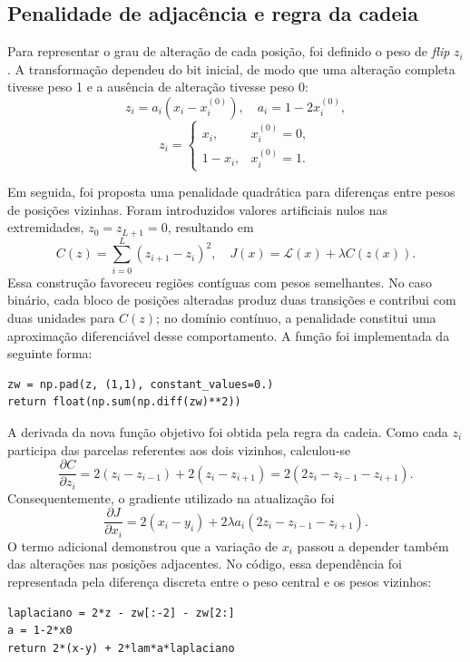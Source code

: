 \documentclass[10pt,a4paper,twocolumn]{article}
\begin{document}
\subsection{Penalidade de adjacência e regra da cadeia}
Para representar o grau de alteração de cada posição, foi definido o peso de \textit{flip} $z_i$. A transformação dependeu do bit inicial, de modo que uma alteração completa tivesse peso 1 e a ausência de alteração tivesse peso 0:
\begin{equation}
 z_i=a_i(x_i-x_i^{(0)}), \quad a_i=1-2x_i^{(0)},
\end{equation}
\vspace{-.8em}
\begin{equation}
z_i=\begin{cases}x_i,&x_i^{(0)}=0,\\1-x_i,&x_i^{(0)}=1.\end{cases}
\end{equation}

Em seguida, foi proposta uma penalidade quadrática para diferenças entre pesos de posições vizinhas. Foram introduzidos valores artificiais nulos nas extremidades, $z_0=z_{L+1}=0$, resultando em
\begin{equation}
\boxed{C(z)=\sum_{i=0}^{L}(z_{i+1}-z_i)^2}, \quad
J(x)=\mathcal{L}(x)+\lambda C(z(x)).
\end{equation}
Essa construção favoreceu regiões contíguas com pesos semelhantes. No caso binário, cada bloco de posições alteradas produz duas transições e contribui com duas unidades para $C(z)$; no domínio contínuo, a penalidade constitui uma aproximação diferenciável desse comportamento. A função foi implementada da seguinte forma:
\begin{lstlisting}
zw = np.pad(z, (1,1), constant_values=0.)
return float(np.sum(np.diff(zw)**2))
\end{lstlisting}

A derivada da nova função objetivo foi obtida pela regra da cadeia. Como cada $z_i$ participa das parcelas referentes aos dois vizinhos, calculou-se
\begin{equation}
\frac{\partial C}{\partial z_i}
=2(z_i-z_{i-1})+2(z_i-z_{i+1})
=2(2z_i-z_{i-1}-z_{i+1}).
\end{equation}
Consequentemente, o gradiente utilizado na atualização foi
\begin{equation}
\boxed{\frac{\partial J}{\partial x_i}
=2(x_i-y_i)+2\lambda a_i
(2z_i-z_{i-1}-z_{i+1}).}
\end{equation}
O termo adicional demonstrou que a variação de $x_i$ passou a depender também das alterações nas posições adjacentes. No código, essa dependência foi representada pela diferença discreta entre o peso central e os pesos vizinhos:
\begin{lstlisting}
laplaciano = 2*z - zw[:-2] - zw[2:]
a = 1-2*x0
return 2*(x-y) + 2*lam*a*laplaciano
\end{lstlisting}
\end{document}

